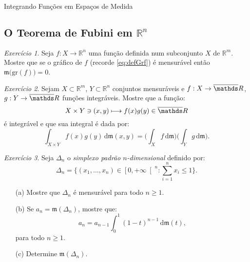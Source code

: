 \documentclass[oneside,final,11pt]{amsbook}
\newcommand{\R}{\mathds R}
\newcommand{\leb}{\mathfrak m}
\newcommand{\dd}{\mathrm d}
\newcommand{\Gr}{\mathrm{gr}}
\theoremstyle{remark}\newtheorem{exercise}{Exercício}[chapter]
\theoremstyle{remark}\newtheorem{*exercise}[exercise]{\hbox to 0pt{\hskip 0pt minus 1fil*}Exercício}
\theoremstyle{definition}\newtheorem{exdefin}{Definição}[chapter]
\theoremstyle{plain}\newtheorem{teo}{Teorema}[section]
\theoremstyle{plain}\newtheorem{lem}[teo]{Lema}
\theoremstyle{plain}\newtheorem{prop}[teo]{Proposição}
\theoremstyle{plain}\newtheorem{cor}[teo]{Corolário}
\theoremstyle{definition}\newtheorem{defin}[teo]{Definição}
\theoremstyle{remark}\newtheorem{rem}[teo]{Observação}
\theoremstyle{definition}\newtheorem{notation}[teo]{Notação}
\theoremstyle{definition}\newtheorem{convention}[teo]{Convenção}
\theoremstyle{definition}\newtheorem{example}[teo]{Exemplo}
\numberwithin{section}{chapter}
\numberwithin{equation}{section}
\begin{document}
\begin{chapter}{Integrando Funções em Espaços de Medida}
\subsection*{O Teorema de Fubini em ${\R^n}$}

\begin{exercise}
Seja $f:X\to\R^n$ uma função definida num subconjunto $X$ de $\R^m$.
Mostre que se o gráfico de $f$ (recorde \eqref{eq:defGrf}) é mensurável então
$\leb\big(\Gr(f)\big)=0$.
\end{exercise}

\begin{exercise}
Sejam $X\subset\R^m$, $Y\subset\R^n$ conjuntos mensuráveis e $f:X\to\overline\R$,
$g:Y\to\overline\R$ funções integráveis. Mostre que a função:
\[X\times Y\ni(x,y)\longmapsto f(x)g(y)\in\overline\R\]
é integrável e que sua integral é dada por:
\[\int_{X\times Y}f(x)g(y)\,\dd\leb(x,y)=\Big(\int_Xf\,\dd\leb\Big)\Big(\int_Yg\,\dd\leb\Big).\]
\end{exercise}

\begin{exercise}
Seja $\Delta_n$ o {\em simplexo padrão $n$-dimensional\/}
definido por:
\[\Delta_n=\Big\{(x_1,\ldots,x_n)\in\left[0,+\infty\right[^n:\sum_{i=1}^nx_i\le1\Big\}.\]
\begin{itemize}
\item[(a)] Mostre que $\Delta_n$ é mensurável para todo $n\ge1$.
\item[(b)] Se $a_n=\leb(\Delta_n)$, mostre que:
\[a_n=a_{n-1}\int_0^1(1-t)^{n-1}\,\dd\leb(t),\]
para todo $n\ge1$.
\item[(c)] Determine $\leb(\Delta_n)$.
\end{itemize}
\end{exercise}

\end{chapter}
\end{document}
